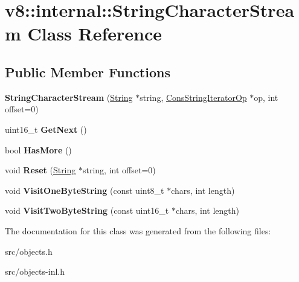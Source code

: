 \hypertarget{classv8_1_1internal_1_1_string_character_stream}{}\section{v8\+:\+:internal\+:\+:String\+Character\+Stream Class Reference}
\label{classv8_1_1internal_1_1_string_character_stream}
\subsection*{Public Member Functions}
\begin{DoxyCompactItemize}
\item 
\hypertarget{classv8_1_1internal_1_1_string_character_stream_a911d786ab8febf26b7e6a5db23eed58d}{}{\bfseries String\+Character\+Stream} (\hyperlink{classv8_1_1internal_1_1_string}{String} $\ast$string, \hyperlink{classv8_1_1internal_1_1_cons_string_iterator_op}{Cons\+String\+Iterator\+Op} $\ast$op, int offset=0)\label{classv8_1_1internal_1_1_string_character_stream_a911d786ab8febf26b7e6a5db23eed58d}

\item 
\hypertarget{classv8_1_1internal_1_1_string_character_stream_a78769916c2be83815a1a5b1a849d73fe}{}uint16\+\_\+t {\bfseries Get\+Next} ()\label{classv8_1_1internal_1_1_string_character_stream_a78769916c2be83815a1a5b1a849d73fe}

\item 
\hypertarget{classv8_1_1internal_1_1_string_character_stream_a5f6356cddd0737cffccb427d703009b0}{}bool {\bfseries Has\+More} ()\label{classv8_1_1internal_1_1_string_character_stream_a5f6356cddd0737cffccb427d703009b0}

\item 
\hypertarget{classv8_1_1internal_1_1_string_character_stream_a3b95592d9d9c070e6659367f0b4b9416}{}void {\bfseries Reset} (\hyperlink{classv8_1_1internal_1_1_string}{String} $\ast$string, int offset=0)\label{classv8_1_1internal_1_1_string_character_stream_a3b95592d9d9c070e6659367f0b4b9416}

\item 
\hypertarget{classv8_1_1internal_1_1_string_character_stream_abe0d02d44289edc138b56869b7d04ae3}{}void {\bfseries Visit\+One\+Byte\+String} (const uint8\+\_\+t $\ast$chars, int length)\label{classv8_1_1internal_1_1_string_character_stream_abe0d02d44289edc138b56869b7d04ae3}

\item 
\hypertarget{classv8_1_1internal_1_1_string_character_stream_acff2c676fd4a935932defc454e3518f5}{}void {\bfseries Visit\+Two\+Byte\+String} (const uint16\+\_\+t $\ast$chars, int length)\label{classv8_1_1internal_1_1_string_character_stream_acff2c676fd4a935932defc454e3518f5}

\end{DoxyCompactItemize}


The documentation for this class was generated from the following files\+:\begin{DoxyCompactItemize}
\item 
src/objects.\+h\item 
src/objects-\/inl.\+h\end{DoxyCompactItemize}
